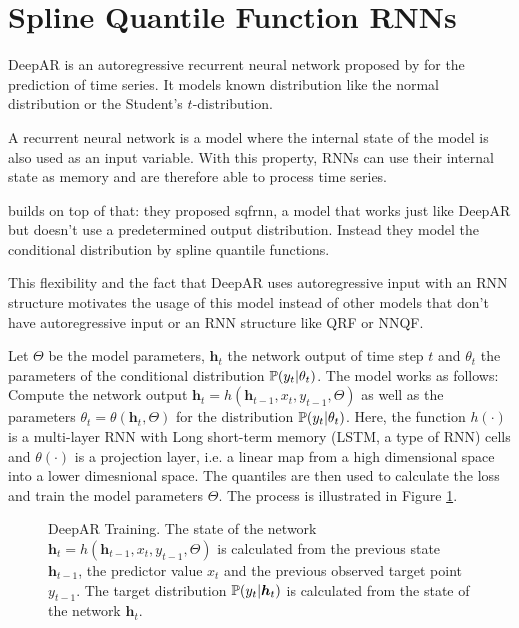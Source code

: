 \section{Spline Quantile Function RNNs}
\label{sec:sqf-rnn}

DeepAR is an autoregressive recurrent neural network proposed by 
\Textcite{Salinas2017} for the prediction of time series. It models 
known distribution like the normal distribution or the Student's \(t\)-distribution. 

A recurrent neural network is a model where the internal state of the model 
is also used as an input variable. With this property, RNNs can use their 
internal state as memory and are therefore able to process time series.

\Textcite{Gasthaus2019} builds on top of that: they proposed \gls{sqfrnn}, 
a model that works just like DeepAR but doesn't use a predetermined output 
distribution. Instead they model the conditional distribution 
by spline quantile functions. 

This flexibility and the fact that DeepAR uses autoregressive input with an RNN structure 
motivates the usage of this model instead of other models that don't 
have autoregressive input or an RNN structure like QRF or NNQF.

Let \(\Theta\) be the model parameters, \(\boldsymbol{h}_t\) the network output of 
time step \(t\) and \(\theta_t\) the parameters of the conditional distribution \(\P(y_t | \theta_t)\).
The model works as follows:
Compute the network output \(\boldsymbol{h}_t = h(\boldsymbol{h}_{t-1}, x_t, y_{t-1}, \Theta)\) 
as well as the parameters \(\theta_t = \theta(\boldsymbol{h}_t, \Theta)\) for the distribution
\(\P(y_t | \theta_t)\). Here, the function \(h(\cdot)\) is a multi-layer RNN with 
Long short-term memory (LSTM, a type of RNN) cells and \(\theta(\cdot)\) is a projection layer, 
i.e. a linear map from a high dimensional space into a lower dimesnional space. 
The quantiles are then used to calculate the loss and train the model parameters \(\Theta\).
The process is illustrated in Figure \ref{fig:deepar-training}. 

\begin{figure}[h]%
    \centering
    
    \caption[DeepAR Training]{DeepAR Training. 
    The state of the network \(\boldsymbol{h}_t = h(\boldsymbol{h}_{t-1}, x_t, y_{t-1}, \Theta)\) 
    is calculated from the previous state \(\boldsymbol{h}_{t-1}\), 
    the predictor value \(x_t\) and the previous observed target point \(y_{t-1}\). 
    The target distribution \(\P(y_t | \boldsymbol{h}_t)\) 
    is calculated from the state of the network \(\boldsymbol{h}_t\).}%
    \label{fig:deepar-training}%
\end{figure}


